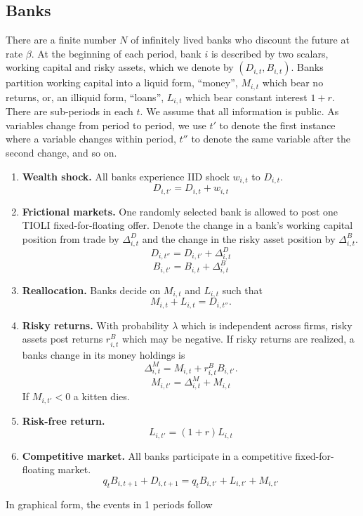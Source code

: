 \documentclass [12pt] {article}
\begin{document}
\subsection{Banks}
There are a finite number $ N $ of infinitely lived banks who discount the future at rate $ \beta $. At the beginning of each period, bank $ i $ is described by two scalars, working capital and risky assets, which we denote by $ (D_{i,t},B_{i,t}) $. Banks partition working capital into a liquid form, ``money'', $ M_{i,t} $ which bear no returns, or, an illiquid form, ``loans'', $ L_{i,t} $ which bear constant interest $ 1 + r $. There are sub-periods in each $ t $. We assume that all information is public. As variables change from period to period, we use $ t' $ to denote the first instance where a variable changes within period, $ t'' $ to denote the same variable after the second change, and so on.
\begin{enumerate}
\item \textbf{Wealth shock.} All banks experience IID shock $ w_{i,t} $ to $ D_{i,t} $. 
\[ D_{i,t'} = D_{i,t} + w_{i,t} \]
\item \textbf{Frictional markets.} One randomly selected bank is allowed to post one TIOLI fixed-for-floating offer. Denote the change in a bank's working capital position from trade by $ \Delta^D_{i,t} $ and the change in the risky asset position by $ \Delta^B_{i,t} $.
\[ D_{i,t''} = D_{i,t'} +  \Delta^D_{i,t} \]
\[ B_{i,t'}  = B_{i,t} +  \Delta^B_{i,t} \]
\item \textbf{Reallocation.} Banks decide on $ M_{i,t} $ and $ L_{i,t} $ such that 
\[ M_{i,t} + L_{i,t} = D_{i,t''}. \]
\item \textbf{Risky returns.} With probability $ \lambda $ which is independent across firms, risky assets post returns $ r^B_{i,t} $ which may be negative. If risky returns are realized, a banks change in its money holdings is 
\[ \Delta^M_{i,t} = M_{i,t} + r^B_{i,t}B_{i,t'}. \] 
\[ M_{i,t'} = \Delta^M_{i,t} + M_{i,t} \] 
If $ M_{i,t'} < 0 $ a kitten dies.
\item \textbf{Risk-free return.} \[ L_{i,t'} = (1+r)L_{i,t} \]
\item \textbf{Competitive market.} All banks participate in a competitive fixed-for-floating market.
\[ q_tB_{i,t+1} + D_{i,t+1} = q_{t}B_{i,t'} + L_{i,t'} + M_{i,t'} \]
\end{enumerate}
In graphical form, the events in 1 periods follow
\end{document}
